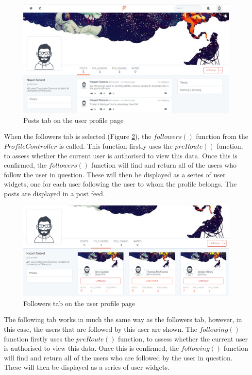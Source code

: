 \begin{figure}[H]
\centering
\includegraphics[width=\textwidth]{Images/Implementation/ProfilePosts}
\caption{Posts tab on the user profile page}
\label{fig:ProfilePosts}
\end{figure}

When the followers tab is selected (Figure \ref{fig:ProfileFollowers}), the \(followers()\) function from the \(ProfileController\) is called. This function firstly uses the \(preRoute()\) function, to assess whether the current user is authorised to view this data. Once this is confirmed, the \(followers()\) function will find and return all of the users who follow the user in question. These will then be displayed as a series of user widgets, one for each user following the user to whom the profile belongs. The posts are displayed in a post feed.

\begin{figure}[H]
\centering
\includegraphics[width=\textwidth]{Images/Implementation/ProfileFollowers}
\caption{Followers tab on the user profile page}
\label{fig:ProfileFollowers}
\end{figure}

The following tab works in much the same way as the followers tab, however, in this case, the users that are followed by this user are shown. The \(following()\) function firstly uses the \(preRoute()\) function, to assess whether the current user is authorised to view this data. Once this is confirmed, the \(following()\) function will find and return all of the users who are followed by the user in question. These will then be displayed as a series of user widgets.

